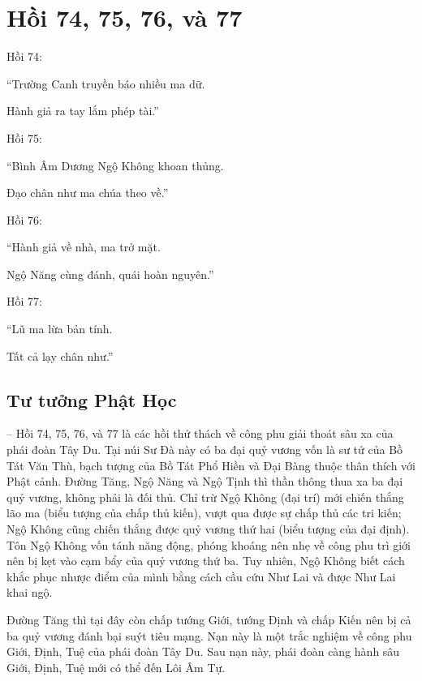 \chapter{Hồi 74, 75, 76, và 77} %
\label{cha:hoi_74_75}

Hồi 74:

\begin{itshape}
``Trường Canh truyền báo nhiều ma dữ.

Hành giả ra tay lắm phép tài.''
\end{itshape}

Hồi 75:

\begin{itshape}
``Bình Âm Dương Ngộ Không khoan thủng.

Đạo chân như ma chúa theo về.''
\end{itshape}

Hồi 76:

\begin{itshape}
``Hành giả về nhà, ma trở mặt.

Ngộ Năng cùng đánh, quái hoàn nguyên.''
\end{itshape}

Hồi 77:

\begin{itshape}
``Lũ ma lừa bản tính.

Tất cả lạy chân như.''
\end{itshape}

\section{Tư tưởng Phật Học} %
\label{sec:74_75_phat_hoc}

-- Hồi 74, 75, 76, và 77 là các hồi thử thách về công phu giải thoát sâu xa của phái đoàn Tây Du. Tại núi Sư Đà này có ba đại quỷ vương vốn là sư tử của Bồ Tát Văn Thù, bạch tượng của Bồ Tát Phổ Hiền và Đại Bàng thuộc thân thích với Phật cảnh. Đường Tăng, Ngộ Năng và Ngộ Tịnh thì thần thông thua xa ba đại quỷ vương, không phải là đối thủ. Chỉ trừ Ngộ Không (đại trí) mới chiến thắng lão ma (biểu tượng của chấp thủ kiến), vượt qua được sự chấp thủ các tri kiến; Ngộ Không cũng chiến thắng được quỷ vương thứ hai (biểu tượng của đại định). Tôn Ngộ Không vốn tánh năng động, phóng khoáng nên nhẹ về công phu trì giới nên bị kẹt vào cạm bẩy của quỷ vương thứ ba. Tuy nhiên, Ngộ Không biết cách khắc phục nhược điểm của mình bằng cách cầu cứu Như Lai và được Như Lai khai ngộ.

Đường Tăng thì tại đây còn chấp tướng Giới, tướng Định và chấp Kiến nên bị cả ba quỷ vương đánh bại suýt tiêu mạng. Nạn này là một trắc nghiệm về công phu Giới, Định, Tuệ của phái đoàn Tây Du. Sau nạn này, phái đoàn càng hành sâu Giới, Định, Tuệ mới có thể đến Lôi Âm Tự.

